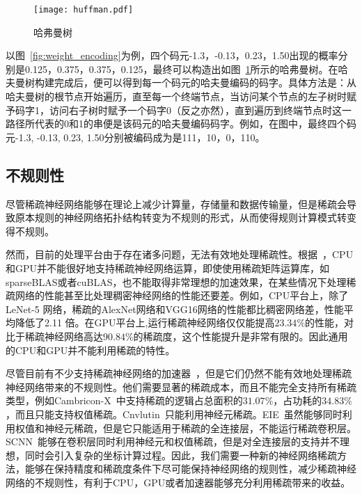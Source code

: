 \begin{figure}[h]
\centering
\texttt{[image: huffman.pdf]}
\caption{哈弗曼树}
\label{fig:huffman}
\end{figure}
以图~\ref{fig:weight_encoding}为例，四个码元-1.3，-0.13，0.23，1.50出现的概率分别是0.125，0.375，0.375，0.125，最终可以构造出如图~\ref{fig:huffman}所示的哈弗曼树。在哈夫曼树构建完成后，便可以得到每一个码元的哈夫曼编码的码字。具体方法是：从哈夫曼树的根节点开始遍历，直至每一个终端节点，当访问某个节点的左子树时赋予码字1，访问右子树时赋予一个码字0（反之亦然），直到遍历到终端节点时这一路径所代表的0和1的串便是该码元的哈夫曼编码码字。例如，在图中，最终四个码元-1.3, -0.13, 0.23, 1.50分别被编码成为是111，10，0，110。

\subsection{不规则性}
尽管稀疏神经网络能够在理论上减少计算量，存储量和数据传输量，但是稀疏会导致原本规则的神经网络拓扑结构转变为不规则的形式，从而使得规则计算模式转变得不规则。

然而，目前的处理平台由于存在诸多问题，无法有效地处理稀疏性。根据~\cite{zhang2016cambricon}，CPU和GPU并不能很好地支持稀疏神经网络运算，即使使用稀疏矩阵运算库，如sparseBLAS或者cuBLAS，也不能取得非常理想的加速效果，在某些情况下处理稀疏网络的性能甚至比处理稠密神经网络的性能还要差。例如，CPU平台上，除了 LeNet-5 网络，稀疏的AlexNet网络和VGG16网络的性能都比稠密网络差，性能平均降低了2.11 倍。在GPU平台上,运行稀疏神经网络仅仅能提高$23.34\%$的性能，对比于稀疏神经网络高达$90.84\%$的稀疏度，这个性能提升是非常有限的。因此通用的CPU和GPU并不能利用稀疏的特性。

尽管目前有不少支持稀疏神经网络的加速器~\cite{zhang2016cambricon, albericio2016cnvlutin, han2016eie, han2017ese, angshuman2017scnn}，但是它们仍然不能有效地处理稀疏神经网络带来的不规则性。他们需要显著的稀疏成本，而且不能完全支持所有稀疏类型，例如Cambricon-X~\cite{zhang2016cambricon}中支持稀疏的逻辑占总面积的$31.07\%$，占功耗的$34.83\%$，而且只能支持权值稀疏。Cnvlutin~\cite{albericio2016cnvlutin}只能利用神经元稀疏。EIE~\cite{han2016eie}虽然能够同时利用权值和神经元稀疏，但是它只能适用于稀疏的全连接层，不能运行稀疏卷积层。SCNN~\cite{angshuman2017scnn}能够在卷积层同时利用神经元和权值稀疏，但是对全连接层的支持并不理想，同时会引入复杂的坐标计算过程。因此，我们需要一种新的神经网络稀疏方法，能够在保持精度和稀疏度条件下尽可能保持神经网络的规则性，减少稀疏神经网络的不规则性，有利于CPU，GPU或者加速器能够充分利用稀疏带来的收益。


